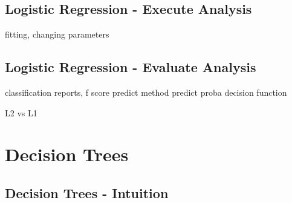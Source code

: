 \documentclass[sigconf]{acmart}
\begin{document}
\subsection{Logistic Regression - Execute Analysis}
fitting, changing parameters

\subsection{Logistic Regression - Evaluate Analysis}

classification reports, f score
predict method
predict proba
decision function

L2 vs L1

\section{Decision Trees}

\subsection{Decision Trees - Intuition}
\end{document}
